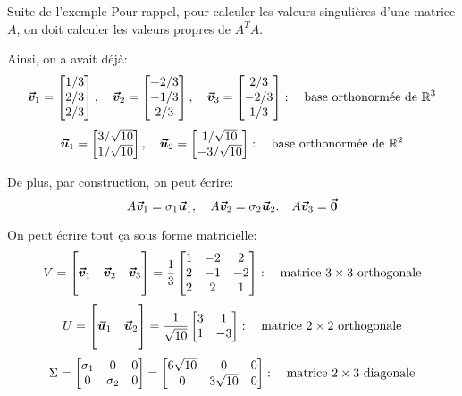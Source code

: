 \documentclass[a4paper]{article}
\begin{document}
\begin{parag}{Suite de l'exemple}
    Pour rappel, pour calculer les valeurs singulières d'une matrice $A$, on doit calculer les valeurs propres de $A^T A$.

    Ainsi, on a avait déjà:
    \[\bm{\protect\vec{v}}_1 = \begin{bmatrix} 1 / 3 \\  2 / 3 \\ 2 / 3\end{bmatrix}, \quad \bm{\protect\vec{v}}_2 = \begin{bmatrix} -2 / 3 \\ -1 / 3 \\ 2 / 3 \end{bmatrix}, \quad \bm{\protect\vec{v}}_3 = \begin{bmatrix} 2 / 3 \\ -2 / 3 \\ 1 / 3 \end{bmatrix}: \quad \text{base orthonormée de } \mathbb{R}^3\]
    \[\bm{\protect\vec{u}}_1 = \begin{bmatrix} 3 / \sqrt{10} \\ 1 / \sqrt{10} \end{bmatrix}, \quad \bm{\protect\vec{u}}_2 = \begin{bmatrix} 1 / \sqrt{10} \\ -3 / \sqrt{10} \end{bmatrix}: \quad \text{base orthonormée de } \mathbb{R}^2\]

    De plus, par construction, on peut écrire:
    \[A \bm{\protect\vec{v}}_1 = \sigma_1 \bm{\protect\vec{u}}_1, \quad A \bm{\protect\vec{v}}_2 = \sigma_2 \bm{\protect\vec{u}}_2. \quad A \bm{\protect\vec{v}}_3 = \bm{\protect\vec{0}}\]

    On peut écrire tout ça sous forme matricielle:
    \[V = \begin{bmatrix}  &  &  \\ \bm{\protect\vec{v}}_1 & \bm{\protect\vec{v}}_2 & \bm{\protect\vec{v}}_3 \\  &  &  \end{bmatrix} = \frac{1}{3} \begin{bmatrix} 1 & -2 & 2 \\ 2 & -1 & -2 \\ 2 & 2 & 1 \end{bmatrix}: \quad \text{matrice $3\times3$ orthogonale}\]
    \[U = \begin{bmatrix}  &  \\ \bm{\protect\vec{u}}_1 & \bm{\protect\vec{u}}_2 \\  &  \end{bmatrix} = \frac{1}{\sqrt{10}} \begin{bmatrix} 3 & 1 \\ 1 & -3 \end{bmatrix}: \quad \text{matrice $2 \times2$ orthogonale} \]
    \[\Sigma = \begin{bmatrix} \sigma_1 & 0 & 0 \\ 0 & \sigma_2 & 0 \end{bmatrix} = \begin{bmatrix} 6 \sqrt{10} & 0 & 0 \\ 0 & 3\sqrt{10} & 0 \end{bmatrix}: \quad \text{matrice $2 \times 3$ diagonale}\]


\end{parag}
\end{document}
